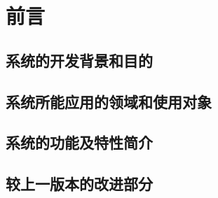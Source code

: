 \chapter{前言}
\section{系统的开发背景和目的}
\section{系统所能应用的领域和使用对象}
\section{系统的功能及特性简介}
\section{较上一版本的改进部分}
